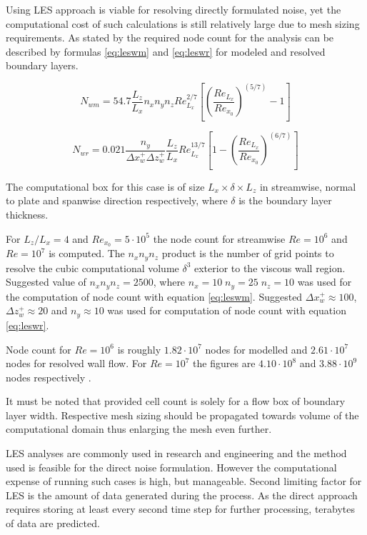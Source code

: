 Using LES approach is viable for resolving directly formulated noise, yet the computational cost of such calculations is still relatively large due to mesh sizing requirements. As stated by \citep{LES_size} the required node count for the analysis can be described by formulas \ref{eq:leswm} and \ref{eq:leswr} for modeled and resolved boundary layers.

\begin{equation} \label{eq:leswm}
N_{wm} = 54.7 \frac{L_z}{L_x} n_x n_y n_z Re^{2/7}_{L_x} \left[ \left( \frac{Re_{L_x}}{Re_{x_0}} \right)^{(5/7)} - 1\right]
\end{equation}

\begin{equation} \label{eq:leswr}
N_{wr} = 0.021 \frac{n_y}{\Delta x_w^{+} \Delta z_w^{+}} \frac{L_z}{L_x} Re^{13/7}_{L_x} \left[ 1 - \left( \frac{Re_{L_x}}{Re_{x_0}} \right)^{(6/7)} \right]
\end{equation}

The computational box for this case is of size $L_x \times \delta \times L_z$ in streamwise, normal to plate and spanwise direction respectively, where $\delta$ is the boundary layer thickness.

For $L_z / L_x = 4$ and $Re_{x_0} = 5 \cdot 10^5$ the node count for streamwise $Re = 10^6$ and $Re = 10^7$ is computed. The $n_x n_y n_z$ product is the number of grid points to resolve the cubic computational volume $\delta^3$ exterior to the viscous wall region. Suggested value of $n_x n_y n_z = 2500$, where $n_x = 10 \; n_y = 25 \; n_z = 10$ was used for the computation of node count with equation \ref{eq:leswm}. Suggested $\Delta x_w^{+} \approx 100$, $\Delta z_w^{+} \approx 20$ and $n_y \approx 10$ was used for computation of node count with equation \ref{eq:leswr}.

Node count for $Re = 10^6$ is roughly $1.82 \cdot 10^{7}$ nodes for modelled and $2.61 \cdot 10^{7}$ nodes for resolved wall flow. For $Re = 10^7$ the figures are $4.10 \cdot 10^{8}$ and $3.88 \cdot 10^{9}$ nodes respectively \citep{LES_size}.

It must be noted that provided cell count is solely for a flow box of boundary layer width. Respective mesh sizing should be propagated towards volume of the computational domain thus enlarging the mesh even further.

LES analyses are commonly used in research and engineering and the method used is feasible for the direct noise formulation. However the computational expense of running such cases is high, but manageable. Second limiting factor for LES is the amount of data generated during the process. As the direct approach requires storing at least every second time step for further processing, terabytes of data are predicted.

